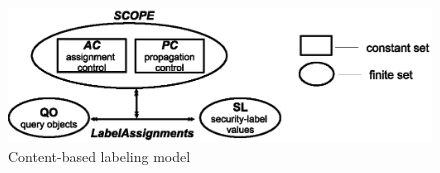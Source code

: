  
 	\begin{figure} [t]
 		\centering
 		\includegraphics[width=1\textwidth]{NSS16/QO-based-labeling}
 		\caption{Content-based labeling model}
 		\label{fig:QO-based-labeling}
 	\end{figure}
 